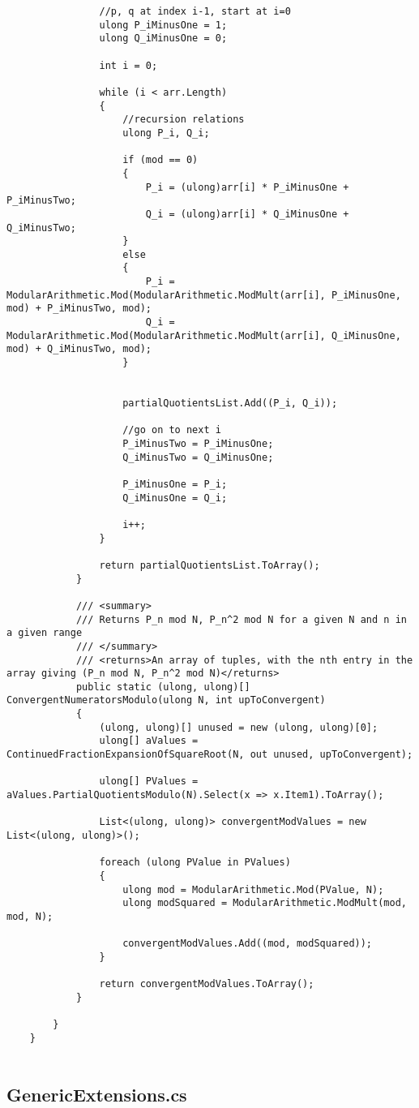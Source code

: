 \documentclass{article}
\begin{document}
\begin{lstlisting}
				//p, q at index i-1, start at i=0
				ulong P_iMinusOne = 1;
				ulong Q_iMinusOne = 0;
				
				int i = 0;
				
				while (i < arr.Length)
				{
					//recursion relations
					ulong P_i, Q_i;
					
					if (mod == 0)
					{
						P_i = (ulong)arr[i] * P_iMinusOne + P_iMinusTwo;
						Q_i = (ulong)arr[i] * Q_iMinusOne + Q_iMinusTwo;
					}
					else
					{
						P_i = ModularArithmetic.Mod(ModularArithmetic.ModMult(arr[i], P_iMinusOne, mod) + P_iMinusTwo, mod);
						Q_i = ModularArithmetic.Mod(ModularArithmetic.ModMult(arr[i], Q_iMinusOne, mod) + Q_iMinusTwo, mod);
					}
					
					
					partialQuotientsList.Add((P_i, Q_i));
					
					//go on to next i
					P_iMinusTwo = P_iMinusOne;
					Q_iMinusTwo = Q_iMinusOne;
					
					P_iMinusOne = P_i;
					Q_iMinusOne = Q_i;
					
					i++;
				}
				
				return partialQuotientsList.ToArray();
			}
			
			/// <summary>
			/// Returns P_n mod N, P_n^2 mod N for a given N and n in a given range
			/// </summary>
			/// <returns>An array of tuples, with the nth entry in the array giving (P_n mod N, P_n^2 mod N)</returns>
			public static (ulong, ulong)[] ConvergentNumeratorsModulo(ulong N, int upToConvergent)
			{
				(ulong, ulong)[] unused = new (ulong, ulong)[0];
				ulong[] aValues = ContinuedFractionExpansionOfSquareRoot(N, out unused, upToConvergent);
				
				ulong[] PValues = aValues.PartialQuotientsModulo(N).Select(x => x.Item1).ToArray();
				
				List<(ulong, ulong)> convergentModValues = new List<(ulong, ulong)>();
				
				foreach (ulong PValue in PValues)
				{
					ulong mod = ModularArithmetic.Mod(PValue, N);
					ulong modSquared = ModularArithmetic.ModMult(mod, mod, N);
					
					convergentModValues.Add((mod, modSquared));
				}
				
				return convergentModValues.ToArray();
			}
			
		}
	}
	
\end{lstlisting}

\subsection{GenericExtensions.cs}
\end{document}
